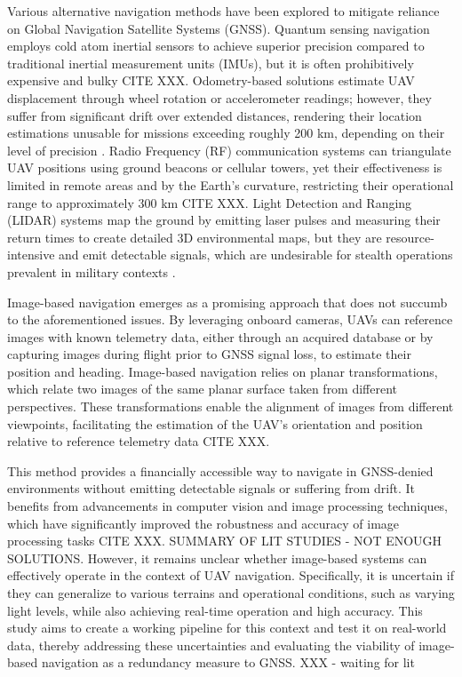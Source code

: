 Various alternative navigation methods have been explored to mitigate reliance on Global Navigation Satellite Systems (GNSS). Quantum sensing navigation employs cold atom inertial sensors to achieve superior precision compared to traditional inertial measurement units (IMUs), but it is often prohibitively expensive and bulky {CITE XXX}. Odometry-based solutions estimate UAV displacement through wheel rotation or accelerometer readings; however, they suffer from significant drift over extended distances, rendering their location estimations unusable for missions exceeding roughly 200 km, depending on their level of precision \cite{Zhuang2023}. Radio Frequency (RF) communication systems can triangulate UAV positions using ground beacons or cellular towers, yet their effectiveness is limited in remote areas and by the Earth's curvature, restricting their operational range to approximately 300 km {CITE XXX}. Light Detection and Ranging (LIDAR) systems map the ground by emitting laser pulses and measuring their return times to create detailed 3D environmental maps, but they are resource-intensive and emit detectable signals, which are undesirable for stealth operations prevalent in military contexts \cite{scoutaerial2024lidar}.

Image-based navigation emerges as a promising approach that does not succumb to the aforementioned issues. By leveraging onboard cameras, UAVs can reference images with known telemetry data, either through an acquired database or by capturing images during flight prior to GNSS signal loss, to estimate their position and heading. Image-based navigation relies on planar transformations, which relate two images of the same planar surface taken from different perspectives. These transformations enable the alignment of images from different viewpoints, facilitating the estimation of the UAV's orientation and position relative to reference telemetry data {CITE XXX}.

This method provides a financially accessible way to navigate in GNSS-denied environments without emitting detectable signals or suffering from drift. It benefits from advancements in computer vision and image processing techniques, which have significantly improved the robustness and accuracy of image processing tasks {CITE XXX}. SUMMARY OF LIT STUDIES - NOT ENOUGH SOLUTIONS. 
However, it remains unclear whether image-based systems can effectively operate in the context of UAV navigation. Specifically, it is uncertain if they can generalize to various terrains and operational conditions, such as varying light levels, while also achieving real-time operation and high accuracy. This study aims to create a working pipeline for this context and test it on real-world data, thereby addressing these uncertainties and evaluating the viability of image-based navigation as a redundancy measure to GNSS.
XXX - waiting for lit

